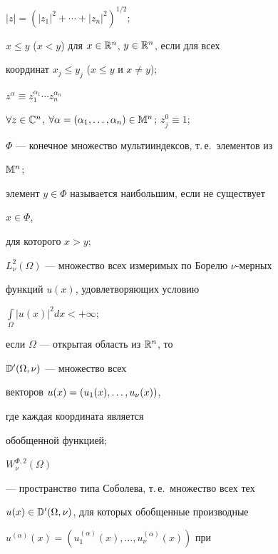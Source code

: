 $|z|=(|z_1|^2+\dotsb+|z_n|^2)^{1/2}$; 


 


$x\le y$ ($x<y$) для $x\in\Bbb R^n$, $y\in\Bbb R^n$, если для всех 


координат $x_j\le y_j$ ($x\le y$ и $x\ne y$);


 


$z^\alpha\equiv z^{\alpha_1}_1\dotsb z^{\alpha_n}_n$ 


$\forall z\in\Bbb C^n$, $\forall\alpha=(\alpha_1,\dotsc,\alpha_n)\in 


\Bbb M^n$; $z^0_j\equiv 1$; 


 


$\Phi$ --- конечное множество мультииндексов, т.\,е.~элементов из 


$\Bbb M^n$; 


 


элемент $y\in\Phi$ называется наибольшим, если не существует 


$x\in\Phi$, 


для которого $x>y$; 


 


$L^2_\nu(\Omega)$ --- множество всех измеримых по Борелю $\nu$-мерных 


функций $u(x)$, удовлетворяющих условию 


$\int\limits_\Omega|u(x)|^2dx<+\infty$; 


 


если $\Omega$ --- открытая область из $\Bbb R^n$, то 


$\Bbb D'(\Omega,\nu)$ --- множество всех 


векторов $u(x)=\linebreak (u_1(x),\dotsc,u_\nu(x))$, 


где каждая координата является 


обобщенной функцией; 


 


$W^{\Phi,2}_\nu(\Omega)$ 


--- пространство типа Соболева, т.\,е.~множество всех тех 


$u(x)\in\Bbb D'(\Omega,\nu)$, для которых обобщенные производные 


$u^{(\alpha)}(x)=(u^{(\alpha)}_1(x),\dotsc,u^{(\alpha)}_\nu(x))$ при 


